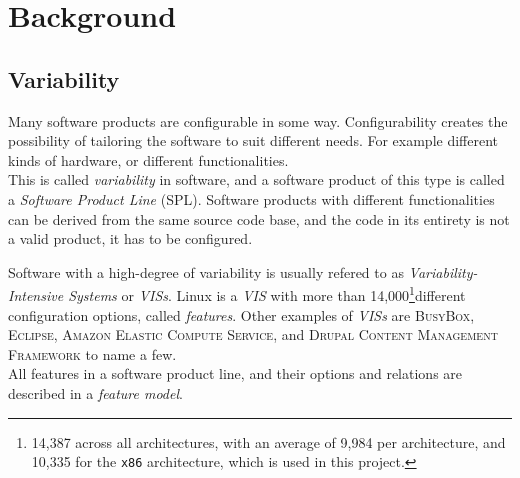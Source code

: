 \documentclass[a4paper,11pt]{report}
\newcommand{\f}{\footnote{\fn}}
\begin{document}

\newpage
        \chapter{Background}

            \section{Variability}
Many software products are configurable in some way. Configurability creates the 
possibility of tailoring the software to suit different needs. For example 
different kinds of hardware, or different functionalities. 
\\

This is called \emph{variability} in software, and a software product of 
this type is called a \emph{Software Product Line} (SPL). Software products 
with different functionalities can be derived from the same source code base, 
and the code in its entirety is not a valid product\cite[p. 1]{IntDatSPL}, it 
has to be configured.
\\

        \def \fn {14,387 across all architectures, with an average of 9,984 per 
        architecture, and 10,335 for the \texttt{x86} architecture, which is used
        in this project.}

Software with a high-degree of variability is usually refered to as 
\emph{Variability-Intensive Systems} or \emph{VISs}. Linux is a \emph{VIS} with 
more than 14,000\f different configuration options, called \emph{features}.
Other examples of \emph{VISs} are \textsc{BusyBox}, \textsc{Eclipse}, 
\textsc{Amazon Elastic Compute Service}, and \textsc{Drupal Content Management 
Framework}\cite[p. 1]{VarTesDrupal} to name a few.
\\

All features in a software product line, and their options and relations are 
described in a \emph{feature model}.
\end{document}

